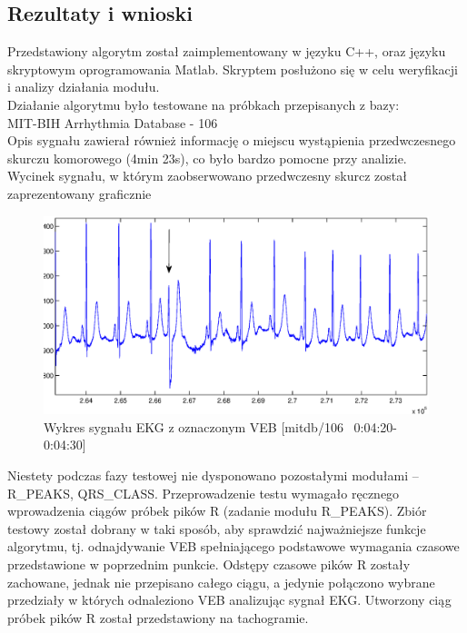 \subsection{Rezultaty i wnioski}
Przedstawiony algorytm został zaimplementowany w języku C++, oraz języku skryptowym oprogramowania Matlab. Skryptem posłużono się w celu weryfikacji i analizy działania modułu.\\ 
Działanie algorytmu było testowane na próbkach przepisanych z bazy:\\
MIT-BIH Arrhythmia Database - 106\\
Opis sygnału zawierał również informację o miejscu wystąpienia przedwczesnego skurczu komorowego (4min 23s), co było bardzo pomocne przy analizie. \\

Wycinek sygnału, w którym zaobserwowano przedwczesny skurcz został zaprezentowany graficznie 

\begin{figure}[h]
\centerline{\includegraphics[scale=0.5]{HRT/HRT6.eps}}
\caption{Wykres sygnału EKG z oznaczonym VEB [mitdb/106 ~0:04:20-0:04:30]}
\end{figure}

Niestety podczas fazy testowej nie dysponowano pozostałymi modułami – R\_PEAKS, QRS\_CLASS. Przeprowadzenie testu wymagało ręcznego wprowadzenia ciągów próbek pików R (zadanie modułu R\_PEAKS). 
Zbiór testowy został dobrany w taki sposób, aby sprawdzić najważniejsze funkcje algorytmu, tj. odnajdywanie VEB spełniającego podstawowe wymagania czasowe przedstawione w poprzednim punkcie. Odstępy czasowe pików R zostały zachowane, jednak nie przepisano całego ciągu, a jedynie połączono wybrane przedziały w których odnaleziono VEB analizując sygnał EKG. Utworzony ciąg próbek pików R został przedstawiony na tachogramie.\\


